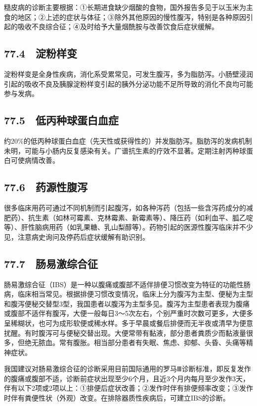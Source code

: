 糙皮病的诊断主要根据：①长期进食缺少烟酸的食物，国外报告多见于以玉米为主食的地区；②上述的症状与体征；③除外其他原因的慢性腹泻，特别是各种原因引起的吸收不良综合征；④及时给予大量烟酰胺与改善饮食后症状缓解。

\subsection{77.4　淀粉样变}

淀粉样变是全身性疾病，消化系受累常见，可发生腹泻，多为脂肪泻。小肠壁浸润引起的吸收不良及胰腺淀粉样变引起的胰外分泌功能不足所导致的消化不良均可能参与发病。

\subsection{77.5　低丙种球蛋白血症}

约20\%的低丙种球蛋白血症（先天性或获得性的）并发脂肪泻。脂肪泻的发病机制未明，可能与小肠内反复感染有关。广谱抗生素的疗效不显著。定期注射丙种球蛋白可使病情改善。

\subsection{77.6　药源性腹泻}

很多临床用药可通过不同机制而引起腹泻，如各种泻药（包括一些含泻药成分的减肥药）、抗生素（如林可霉素、克林霉素、新霉素等）、降压药（如利血平、胍乙啶等）、肝性脑病用药（如乳果糖、乳山梨醇等）。药物引起的医源性腹泻临床并不少见，注意病史询问及停药后症状缓解有助识别。

\subsection{77.7　肠易激综合征}

肠易激综合征（IBS）是一种以腹痛或腹部不适伴排便习惯改变为特征的功能性肠病，临床相当常见。根据排便习惯改变情况，临床上分为腹泻为主型、便秘为主型和腹泻便秘交替型3型，我国患者以腹泻为主型多见。腹泻为主型患者表现为腹痛或腹部不适伴有腹泻，大便一般每日3～5次左右，个别严重时次数可更多，大便多呈稀糊状，也可为成形软便或稀水样。多于早晨或餐后排便而无半夜或清早为便意扰醒。有时腹泻可与便秘交替出现。大便常带有黏液，部分患者粪质少而黏液量很多，但绝无脓血。常有腹胀。相当部分患者有失眠、焦虑、抑郁、头昏、头痛等精神症状。

我国建议对肠易激综合征的诊断采用目前国际通用的罗马Ⅲ诊断标准，即反复发作的腹痛或腹部不适，诊断前症状出现至少6个月，且近3个月内每月至少发作3天，伴有以下2项或2项以上：①排便后症状改善；②发作时伴有排便频率改变；③发作时伴有粪便性状（外观）改变。在排除器质性疾病后，可建立IBS的诊断。

